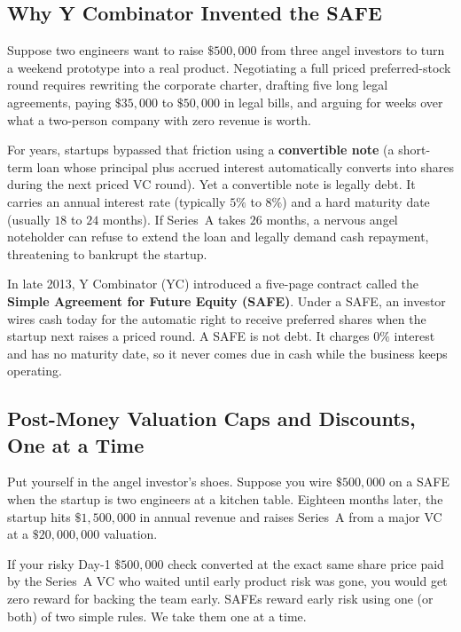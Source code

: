 \subsection{Why Y Combinator Invented the SAFE}

Suppose two engineers want to raise $\$500{,}000$ from three angel investors to turn a weekend prototype into a real product. Negotiating a full priced preferred-stock round requires rewriting the corporate charter, drafting five long legal agreements, paying $\$35{,}000$ to $\$50{,}000$ in legal bills, and arguing for weeks over what a two-person company with zero revenue is worth.

For years, startups bypassed that friction using a \textbf{convertible note} (a short-term loan whose principal plus accrued interest automatically converts into shares during the next priced VC round). Yet a convertible note is legally debt. It carries an annual interest rate (typically $5\%$ to $8\%$) and a hard maturity date (usually $18$ to $24$ months). If Series~A takes $26$ months, a nervous angel noteholder can refuse to extend the loan and legally demand cash repayment, threatening to bankrupt the startup.

In late 2013, Y Combinator (YC) introduced a five-page contract called the \textbf{Simple Agreement for Future Equity (SAFE)}. Under a SAFE, an investor wires cash today for the automatic right to receive preferred shares when the startup next raises a priced round. A SAFE is not debt. It charges $0\%$ interest and has no maturity date, so it never comes due in cash while the business keeps operating.

\subsection{Post-Money Valuation Caps and Discounts, One at a Time}

Put yourself in the angel investor's shoes. Suppose you wire $\$500{,}000$ on a SAFE when the startup is two engineers at a kitchen table. Eighteen months later, the startup hits $\$1{,}500{,}000$ in annual revenue and raises Series~A from a major VC at a $\$20{,}000{,}000$ valuation.

If your risky Day-1 $\$500{,}000$ check converted at the exact same share price paid by the Series~A VC who waited until early product risk was gone, you would get zero reward for backing the team early. SAFEs reward early risk using one (or both) of two simple rules. We take them one at a time.

